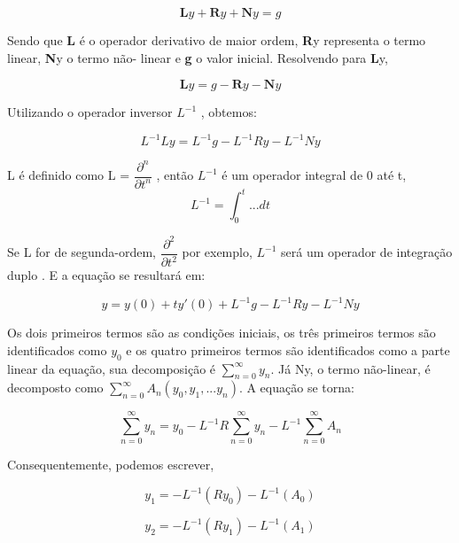  \begin{equation}  \textbf{L}y +  \textbf{R}y +  \textbf{N}y = g\end{equation}

Sendo que \textbf{L} é o operador derivativo de maior ordem, \textbf{R}y representa o termo linear, \textbf{N}y o termo não- linear e \textbf{g} o valor inicial. Resolvendo para \textbf{L}y,

 \begin{equation}  \textbf{L}y =  g - \textbf{R}y - \textbf{N}y \end{equation}
 
  Utilizando o operador inversor $L^{-1}$ , obtemos:
  
  \begin{equation}
  L^{-1}Ly =  L^{-1}g -  L^{-1}Ry -  L^{-1}Ny
  \end{equation}
  
  L é definido como L = $\dfrac{\partial^n }{\partial t^n}$ , então $L^{-1}$ é um operador integral de 0 até t,
  \begin{equation}
  L^{-1}= \int_0^{t} ...dt
  \end{equation}
  
  Se L for de segunda-ordem, $\dfrac{\partial^2 }{\partial t^2}$ por exemplo, $L^{-1}$ será um operador de integração duplo . E a equação se resultará em:
  
  \begin{equation}
  y= y(0) + ty'(0) + L^{-1}g - L^{-1}Ry - L^{-1}Ny
  \end{equation}

 Os dois primeiros termos são as condições iniciais, os três primeiros termos são identificados como  $y_{0}$ e os quatro primeiros termos são identificados como a parte linear da equação, sua decomposição é $\sum_{n=0}^{\infty} y_{n}$. Já Ny, o termo não-linear, é decomposto como $\sum_{n=0}^{\infty} A_{n}(y_{0},y_{1},...y_{n})$. A equação se torna:
 
 \begin{equation}
 \sum_{n=0}^{\infty} y_{n} = y_{0} - L^{-1}R \sum_{n=0}^{\infty} y_{n} - L^{-1}\sum_{n=0}^{\infty} A_{n}
 \end{equation}
 
 Consequentemente, podemos escrever,
 
 \begin{equation}
 y_{1} = -L^{-1} (Ry_{0}) - L^{-1}(A_{0}) \end{equation}
 
 \begin{equation}y_{2} = -L^{-1} (Ry_{1}) - L^{-1}(A_{1})\end{equation}
 
